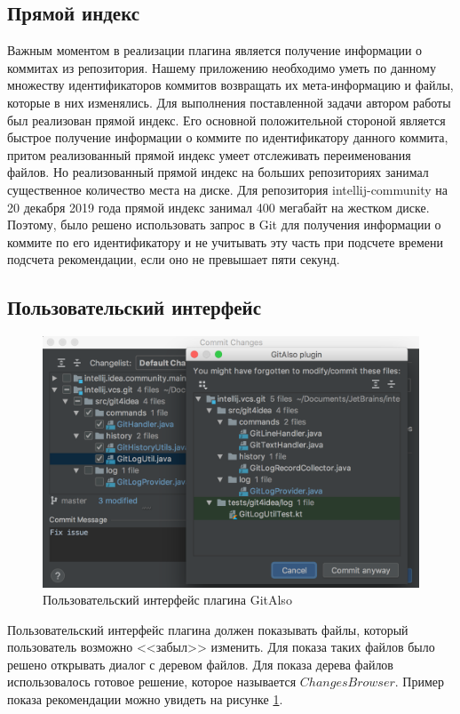 \documentclass[times]{itmo-student-thesis}
\begin{document}
\subsection{Прямой индекс}\label{forward-index}
Важным моментом в реализации плагина является получение информации о коммитах из репозитория. Нашему приложению необходимо уметь по данному множеству идентификаторов коммитов возвращать их мета-информацию и файлы, которые в них изменялись. Для выполнения поставленной задачи автором работы был реализован прямой индекс. Его основной положительной стороной является быстрое получение информации о коммите по идентификатору данного коммита, притом реализованный прямой индекс умеет отслеживать переименования файлов. Но реализованный прямой индекс на больших репозиториях занимал существенное количество места на диске. Для репозитория intellij-community на 20 декабря 2019 года прямой индекс занимал 400 мегабайт на жестком диске. Поэтому, было решено использовать запрос в Git для получения информации о коммите по его идентификатору и не учитывать эту часть при подсчете времени подсчета рекомендации, если оно не превышает пяти секунд.
\subsection{Пользовательский интерфейс}\label{git-also-ui}
\begin{figure}[!h]
\caption{Пользовательский интерфейс плагина GitAlso}\label{git-also-screen}
\centering
\includegraphics[scale=0.6]{GitAlso.png}
\end{figure}
Пользовательский интерфейс плагина должен показывать файлы, который пользователь возможно <<забыл>> изменить. Для показа таких файлов было решено открывать диалог с деревом файлов. Для показа дерева файлов использовалось готовое решение, которое называется $ChangesBrowser$. Пример показа рекомендации можно увидеть на рисунке  \ref{git-also-screen}.
\end{document}
